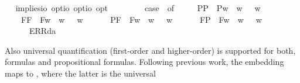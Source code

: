 \begin{isabellebody}
\ \isamarkupfalse%
\ implies{\isacharcolon}{\isacharcolon}{\isachardoublequoteopen}io\ opt{\isasymRightarrow}io\ opt{\isasymRightarrow}io\ opt{\isachardoublequoteclose}\ {\isacharparenleft}\ {\isachardoublequoteopen}\isactrlbold {\isasymrightarrow}{\isachardoublequoteclose}\ {}{}{\isacharparenright}\ \ {\isachardoublequoteopen}{\isasymphi}\ \isactrlbold {\isasymrightarrow}\ {\isasympsi}\ {\isasymequiv}\ case\ {\isacharparenleft}{\isasymphi}{\isacharcomma}{\isasympsi}{\isacharparenright}\ of\ \isanewline
\ \ \ \ {\isacharparenleft}P{\isacharparenleft}{\isasymalpha}{\isacharparenright}{\isacharcomma}P{\isacharparenleft}{\isasymbeta}{\isacharparenright}{\isacharparenright}\ {\isasymRightarrow}\ P{\isacharparenleft}{\isasymlambda}w{\isachardot}\ {\isasymalpha}\ w\ {\isasymlongrightarrow}\ {\isasymbeta}\ w{\isacharparenright}\ {\isacharbar}\ \isanewline
\ \ \ \ {\isacharparenleft}F{\isacharparenleft}{\isasymalpha}{\isacharparenright}{\isacharcomma}F{\isacharparenleft}{\isasymbeta}{\isacharparenright}{\isacharparenright}\ {\isasymRightarrow}\ F{\isacharparenleft}{\isasymlambda}w{\isachardot}\ {\isasymalpha}\ w\ {\isasymlongrightarrow}\ {\isasymbeta}\ w{\isacharparenright}\ {\isacharbar}\ \isanewline
\ \ \ \ {\isacharparenleft}P{\isacharparenleft}{\isasymalpha}{\isacharparenright}{\isacharcomma}F{\isacharparenleft}{\isasymbeta}{\isacharparenright}{\isacharparenright}\ {\isasymRightarrow}\ F{\isacharparenleft}{\isasymlambda}w{\isachardot}\ {\isasymalpha}\ w\ {\isasymlongrightarrow}\ {\isasymbeta}\ w{\isacharparenright}\ {\isacharbar}\ \isanewline
\ \ \ \ {\isacharparenleft}F{\isacharparenleft}{\isasymalpha}{\isacharparenright}{\isacharcomma}P{\isacharparenleft}{\isasymbeta}{\isacharparenright}{\isacharparenright}\ {\isasymRightarrow}\ F{\isacharparenleft}{\isasymlambda}w{\isachardot}\ {\isasymalpha}\ w\ {\isasymlongrightarrow}\ {\isasymbeta}\ w{\isacharparenright}\ {\isacharbar}\ \isanewline
\ \ \ \ {\isacharunderscore}\ {\isasymRightarrow}\ ERR{\isacharparenleft}da{\isacharparenright}{\isachardoublequoteclose}%
\begin{isamarkuptext}%
Also universal quantification  (first-order and higher-order) is supported 
  for both, formulas  and propositional formulas. Following previous work, the embedding maps 
   to , where the latter \isa{{\isasymforall}} is the universal 

\end{isamarkuptext}
\end{isabellebody}
